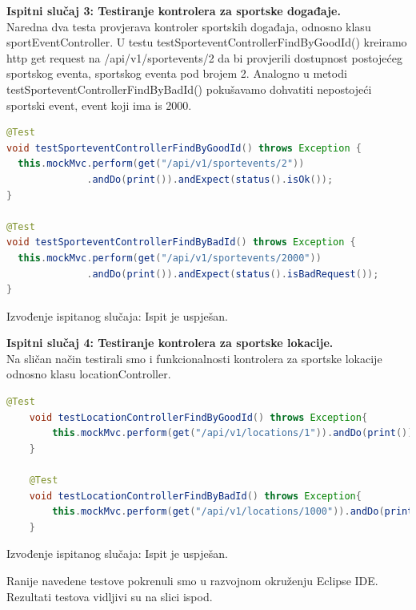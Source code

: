 			\hfill\break
			\noindent\textbf{Ispitni slučaj 3: Testiranje kontrolera za sportske događaje.}\\
		Naredna dva testa provjerava kontroler sportskih događaja,
		 odnosno klasu sportEventController. 
		U testu testSporteventControllerFindByGoodId() kreiramo http get request na /api/v1/sportevents/2   da bi provjerili dostupnost postojećeg sportskog eventa, sportskog eventa pod brojem 2.
			Analogno u metodi testSporteventControllerFindByBadId() pokušavamo dohvatiti nepostojeći sportski event, event koji ima is 2000.
			
			\begin{lstlisting}[language=Java,caption={testSporteventControllerFindById},label=DescriptiveLabel]
@Test
void testSporteventControllerFindByGoodId() throws Exception {
  this.mockMvc.perform(get("/api/v1/sportevents/2"))
              .andDo(print()).andExpect(status().isOk());
}

@Test
void testSporteventControllerFindByBadId() throws Exception {
  this.mockMvc.perform(get("/api/v1/sportevents/2000"))
              .andDo(print()).andExpect(status().isBadRequest());
}
			\end{lstlisting}
			\noindent Izvođenje ispitanog slučaja: Ispit je uspješan.
			
			\hfill\break
			\noindent\textbf{Ispitni slučaj 4: Testiranje kontrolera za sportske lokacije.}\\
			Na sličan način testirali smo i funkcionalnosti kontrolera za sportske lokacije odnosno klasu locationController.
			
			\begin{lstlisting}[language=Java,caption={testLocationControllerFindById},label=DescriptiveLabel]	
	@Test
	void testLocationControllerFindByGoodId() throws Exception{
		this.mockMvc.perform(get("/api/v1/locations/1")).andDo(print()).andExpect(status().isOk());
	}

	@Test
	void testLocationControllerFindByBadId() throws Exception{
		this.mockMvc.perform(get("/api/v1/locations/1000")).andDo(print()).andExpect(status().isBadRequest());
	}

	        \end{lstlisting}
			\noindent Izvođenje ispitanog slučaja: Ispit je uspješan.
		\hfill\break
	
	Ranije navedene testove pokrenuli smo u razvojnom okruženju Eclipse IDE. Rezultati testova vidljivi su na slici ispod.		
			
